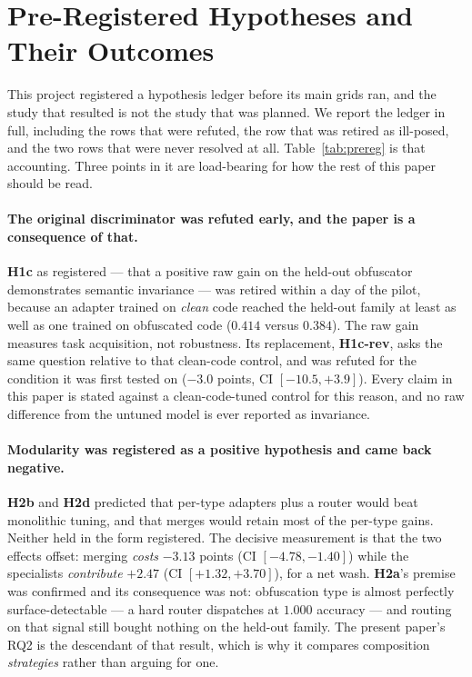 \section{Pre-Registered Hypotheses and Their Outcomes}
\label{sec:prereg}

This project registered a hypothesis ledger before its main grids ran, and the study that resulted
is not the study that was planned. We report the ledger in full, including the rows that were
refuted, the row that was retired as ill-posed, and the two rows that were never resolved at all.
Table~\ref{tab:prereg} is that accounting. Three points in it are load-bearing for how the rest of
this paper should be read.

\paragraph{The original discriminator was refuted early, and the paper is a consequence of that.}
\textbf{H1c} as registered --- that a positive raw gain on the held-out obfuscator demonstrates
semantic invariance --- was retired within a day of the pilot, because an adapter trained on
\emph{clean} code reached the held-out family at least as well as one trained on obfuscated code
($0.414$ versus $0.384$). The raw gain measures task acquisition, not robustness. Its replacement,
\textbf{H1c-rev}, asks the same question relative to that clean-code control, and was refuted for
the condition it was first tested on ($-3.0$ points, CI $[-10.5, +3.9]$). Every claim in this paper
is stated against a clean-code-tuned control for this reason, and no raw difference from the
untuned model is ever reported as invariance.

\paragraph{Modularity was registered as a positive hypothesis and came back negative.}
\textbf{H2b} and \textbf{H2d} predicted that per-type adapters plus a router would beat monolithic
tuning, and that merges would retain most of the per-type gains. Neither held in the form
registered. The decisive measurement is that the two effects offset: merging \emph{costs}
$-3.13$ points (CI $[-4.78, -1.40]$) while the specialists \emph{contribute} $+2.47$
(CI $[+1.32, +3.70]$), for a net wash. \textbf{H2a}'s premise was confirmed and its consequence was
not: obfuscation type is almost perfectly surface-detectable --- a hard router dispatches at
$1.000$ accuracy --- and routing on that signal still bought nothing on the held-out family. The
present paper's RQ2 is the descendant of that result, which is why it compares composition
\emph{strategies} rather than arguing for one.


